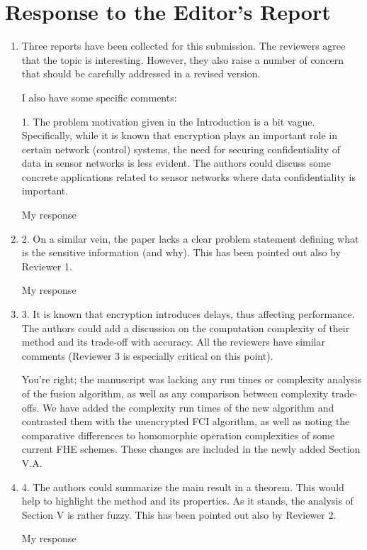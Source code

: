 \documentclass[a4paper]{scrartcl}
\newenvironment{rebuttal}{\begin{enumerate}[label={\color{grey}\thesection.\arabic{enumi}},leftmargin=0pt,ref=\thesection.\arabic{enumi}]}{\end{enumerate}}
\newcommand{\reviewtext}[1]{{\color{nblue} #1}}
\begin{document}
\section*{Response to the Editor's Report}
\def\thesection{E}
\begin{rebuttal} %
\item \reviewtext{Three reports have been collected for this submission. The reviewers
agree that the topic is interesting. However, they also raise a number
of concern that should be carefully addressed in a revised version. 

I also have some specific comments:

1. The problem motivation given in the Introduction is a bit vague.
Specifically, while it is known that encryption plays an important role
in certain network (control) systems, the need for securing
confidentiality of data in sensor networks is less evident. The authors
could discuss some concrete applications related to sensor networks
where data confidentiality is important.}

My response

\item \reviewtext{2. On a similar vein, the paper lacks a clear problem statement
defining what is the sensitive information (and why). This has been
pointed out also by Reviewer 1.}

My response

\item \reviewtext{3. It is known that encryption introduces delays, thus affecting
performance. The authors could add a discussion on the computation
complexity of their method and its trade-off with accuracy. All the
reviewers have similar comments (Reviewer 3 is especially critical on
this point).}

You're right; the manuscript was lacking any run times or complexity analysis of the fusion algorithm, as well as any comparison between complexity trade-offs. We have added the complexity run times of the new algorithm and contrasted them with the unencrypted FCI algorithm, as well as noting the comparative differences to homomorphic operation complexities of some current FHE schemes. These changes are included in the newly added Section V.A.

\item \reviewtext{4. The authors could summarize the main result in a theorem. This would
help to highlight the method and its properties. As it stands, the
analysis of Section V is rather fuzzy. This has been pointed out also
by Reviewer 2.}

My response

\end{rebuttal}
\end{document}
